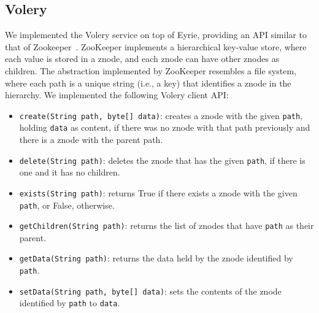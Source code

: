 
\subsection{Volery}
\label{sec:zkssmr}

We implemented the Volery service on top of Eyrie, providing an API similar to that of Zookeeper~\cite{ZOO2010}. 
%
ZooKeeper implements a hierarchical key-value store, where each value is stored in a znode, and each znode can have other znodes as children. 
The abstraction implemented by ZooKeeper resembles a file system, where each path is a unique string (i.e., a key) that identifies a znode in the hierarchy. 
We implemented the following Volery client API:

\begin{itemize}

\item \verb#create(String path, byte[] data)#: creates a znode with the given \verb#path#, holding \verb#data# as content, if there was no znode with that path previously and there is a znode with the parent path.

\item \verb#delete(String path)#: deletes the znode that has the given \verb#path#, if there is one and it has no children.

\item \verb#exists(String path)#: returns True if there exists a znode with the given \verb#path#, or False, otherwise.

\item \verb#getChildren(String path)#: returns the list of znodes that have \verb#path# as their parent.

\item \verb#getData(String path)#: returns the data held by the znode identified by \verb#path#.

\item \verb#setData(String path, byte[] data)#: sets the contents of the znode identified by \verb#path# to \verb#data#.

\end{itemize}

